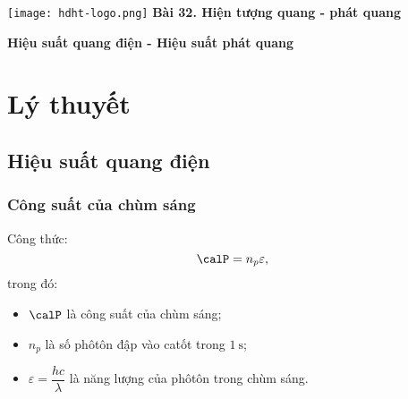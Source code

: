 \newcommand{\chapter}[2][]{
	\newcommand{\chapname}{#2}
	\begin{flushleft}
		\begin{minipage}[t]{\linewidth}
			\texttt{[image: hdht-logo.png]}
			\hspace{0pt}	
			\sffamily\bfseries\large Bài  32. Hiện tượng quang - phát quang
			\begin{flushleft}
				\huge\bfseries #1
			\end{flushleft}
		\end{minipage}
	\end{flushleft}
	\vspace{1cm}
	\normalfont\normalsize
}
\chapter[Hiệu suất quang điện - Hiệu suất phát quang]{Hiệu suất quang điện - Hiệu suất phát quang}
\section{Lý thuyết}

\subsection{Hiệu suất quang điện}

\subsubsection{Công suất của chùm sáng}
	Công thức:
	\begin{equation}
		\calP=n_p\varepsilon,
	\end{equation}
trong đó:
	\begin{itemize}
		\item $\calP$ là công suất của chùm sáng;
		\item $n_p$ là số phôtôn đập vào catốt trong $\SI{1}{\second}$;
		\item $\varepsilon=\dfrac{hc}{\lambda}$ là năng lượng của phôtôn trong chùm sáng.
	\end{itemize}
